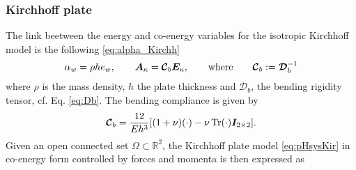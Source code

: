 \subsubsection{Kirchhoff plate}\label{sec:discr_Kir}
The link beetween the energy and co-energy variables for the isotropic Kirchhoff model is the following \eqref{eq:alpha_Kirchh}
\begin{equation}
\alpha_w ={\rho h}e_w , \qquad \bm{A}_{\kappa} = \bm{\mathcal{C}}_b\bm{E}_{\kappa}, \qquad \text{where} \qquad \bm{\mathcal{C}}_b :=  \bm{\mathcal{D}}_b^{-1}
\end{equation}
where $\rho$ is the mass density, $h$ the plate thickness and $\bm{\mathcal{D}}_b$, the bending rigidity tensor, cf. Eq. \eqref{eq:Db}. The bending compliance is given by 
\begin{equation}\label{eq:bend_compliace}
\bm{\mathcal{C}}_b = \frac{12}{E h^3}[(1 + \nu)(\cdot) - \nu \operatorname{Tr}(\cdot)\bm{I}_{2\times 2}].
\end{equation}
Given an open connected set $\Omega\subset \mathbb{R}^2$, the Kirchhoff plate model \eqref{eq:pHsysKir} in co-energy form controlled by forces and momenta is then expressed as 

